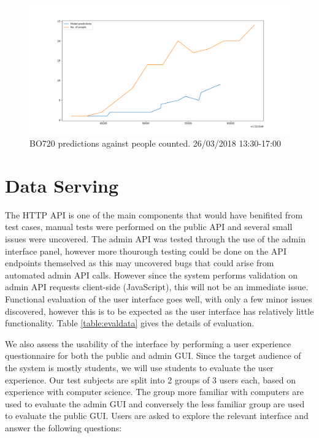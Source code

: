 \documentclass{l4proj}
\begin{document}
\begin{figure}
\centering
\includegraphics[width=\textwidth]{bo720predictions}
\caption{BO720 predictions against people counted. 26/03/2018  13:30-17:00}
\label{fig:bo720predictions}
\end{figure}






\section{Data Serving}

The HTTP API is one of the main components that would have benifited from test cases, manual tests were performed on the public API and several small issues were uncovered. The admin API was tested through the use of the admin interface panel, however more thourough testing could be done on the API endpoints themselved as this may uncovered bugs that could arise from automated admin API calls. However since the system performs validation on admin API requests client-side (JavaScript), this will not be an immediate issue. Functional evaluation of the user interface goes well, with only a few minor issues discovered, however this is to be expected as the user interface has relatively little functionality. Table \ref{table:evaldata} gives the details of evaluation. 

We also assess the usability of the interface by performing a user experience questionnaire for both the public and admin GUI. Since the target audience of the system is mostly students, we will use students to evaluate the user experience. Our test subjects are split into 2 groups of 3 users each, based on experience with computer science. The group more familiar with computers are used to evaluate the admin GUI and conversely the less familiar group are used to evaluate the public GUI. Users are asked to explore the relevant interface and answer the following questions:
\end{document}
